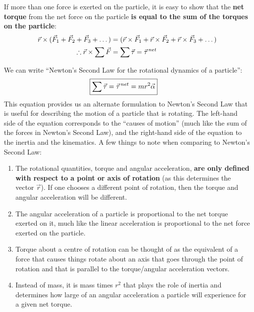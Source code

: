 If more than one force is exerted on the particle, it is easy to show that the \textbf{net torque} from the net force on the particle \textbf{is equal to the sum of the torques on the particle}:
\begin{align*}
\vec r \times (\vec F_1 + \vec F_2 + \vec F_3 + \dots) &=  (\vec r \times \vec F_1 + \vec r \times \vec F_2 + \vec r \times \vec F_3 + \dots) \\
\therefore \vec r \times \sum \vec F &= \sum \vec \tau = \pvec \tau^{net}
\end{align*}

We can write ``Newton's Second Law for the rotational dynamics of a particle'':
\begin{align}
\Aboxed{\sum \vec \tau = \pvec \tau ^{net} = mr^2 \vec \alpha}
\end{align}
This equation provides us an alternate formulation to Newton's Second Law that is useful for describing the motion of a particle that is rotating. The left-hand side of the equation corresponds to the ``causes of motion'' (much like the sum of the forces in Newton's Second Law), and the right-hand side of the equation to the inertia and the kinematics. A few things to note when comparing to Newton's Second Law:
\begin{enumerate}
\item The rotational quantities, torque and angular acceleration, \textbf{are only defined with respect to a point or axis of rotation} (as this determines the vector $\vec r$). If one chooses a different point of rotation, then the torque and angular acceleration will be different.
\item The angular acceleration of a particle is proportional to the net torque exerted on it, much like the linear acceleration is proportional to the net force exerted on the particle.
\item Torque about a centre of rotation can be thought of as the equivalent of a force that causes things rotate about an axis that goes through the point of rotation and that is parallel to the torque/angular acceleration vectors.
\item Instead of mass, it is mass times $r^2$ that plays the role of inertia and determines how large of an angular acceleration a particle will experience for a given net torque.  
\end{enumerate}

